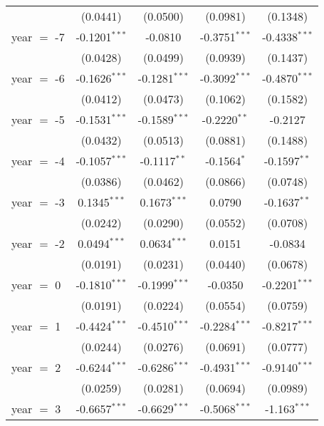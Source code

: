 \begin{tabular}{lcccc}
                     & (0.0441)        & (0.0500)        & (0.0981)        & (0.1348)\\   
   year $=$ -7       & -0.1201$^{***}$ & -0.0810         & -0.3751$^{***}$ & -0.4338$^{***}$\\   
                     & (0.0428)        & (0.0499)        & (0.0939)        & (0.1437)\\   
   year $=$ -6       & -0.1626$^{***}$ & -0.1281$^{***}$ & -0.3092$^{***}$ & -0.4870$^{***}$\\   
                     & (0.0412)        & (0.0473)        & (0.1062)        & (0.1582)\\   
   year $=$ -5       & -0.1531$^{***}$ & -0.1589$^{***}$ & -0.2220$^{**}$  & -0.2127\\   
                     & (0.0432)        & (0.0513)        & (0.0881)        & (0.1488)\\   
   year $=$ -4       & -0.1057$^{***}$ & -0.1117$^{**}$  & -0.1564$^{*}$   & -0.1597$^{**}$\\   
                     & (0.0386)        & (0.0462)        & (0.0866)        & (0.0748)\\   
   year $=$ -3       & 0.1345$^{***}$  & 0.1673$^{***}$  & 0.0790          & -0.1637$^{**}$\\   
                     & (0.0242)        & (0.0290)        & (0.0552)        & (0.0708)\\   
   year $=$ -2       & 0.0494$^{***}$  & 0.0634$^{***}$  & 0.0151          & -0.0834\\   
                     & (0.0191)        & (0.0231)        & (0.0440)        & (0.0678)\\   
   year $=$ 0        & -0.1810$^{***}$ & -0.1999$^{***}$ & -0.0350         & -0.2201$^{***}$\\   
                     & (0.0191)        & (0.0224)        & (0.0554)        & (0.0759)\\   
   year $=$ 1        & -0.4424$^{***}$ & -0.4510$^{***}$ & -0.2284$^{***}$ & -0.8217$^{***}$\\   
                     & (0.0244)        & (0.0276)        & (0.0691)        & (0.0777)\\   
   year $=$ 2        & -0.6244$^{***}$ & -0.6286$^{***}$ & -0.4931$^{***}$ & -0.9140$^{***}$\\   
                     & (0.0259)        & (0.0281)        & (0.0694)        & (0.0989)\\   
   year $=$ 3        & -0.6657$^{***}$ & -0.6629$^{***}$ & -0.5068$^{***}$ & -1.163$^{***}$\\   

\end{tabular}
